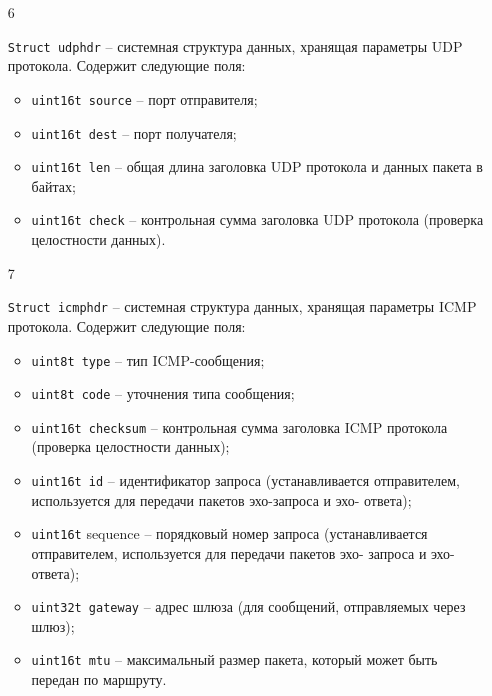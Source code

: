 \begin{enumerate}
    \item[6] {{\texttt{Struct udphdr}} -- системная структура данных, хранящая параметры UDP
    протокола. Содержит следующие поля:
        \begin{itemize}
            \item \texttt{u{\textunderscore}int16{\textunderscore}t source} -- порт отправителя;
            \item \texttt{u{\textunderscore}int16{\textunderscore}t dest} -- порт получателя;
            \item \texttt{u{\textunderscore}int16{\textunderscore}t len} -- общая длина заголовка UDP протокола и данных
            пакета в байтах;
            \item \texttt{u{\textunderscore}int16{\textunderscore}t check} -- контрольная сумма заголовка UDP протокола
            (проверка целостности данных).
        \end{itemize}}

    \item[7] {{\texttt{Struct icmphdr}} -- системная структура данных, хранящая параметры
    ICMP протокола. Содержит следующие поля:
    \begin{itemize}
        \item \texttt{u{\textunderscore}int8{\textunderscore}t type} -- тип ICMP-сообщения;
        \item \texttt{u{\textunderscore}int8{\textunderscore}t code} -- уточнения типа сообщения;
        \item \texttt{u{\textunderscore}int16{\textunderscore}t checksum} -- контрольная сумма заголовка ICMP
        протокола (проверка целостности данных);
        \item \texttt{u{\textunderscore}int16{\textunderscore}t id} -- идентификатор запроса (устанавливается
        отправителем, используется для передачи пакетов эхо-запроса и эхо-
        ответа);
        \item \texttt{u{\textunderscore}int16{\textunderscore}t} sequence -- порядковый номер запроса
        (устанавливается отправителем, используется для передачи пакетов эхо-
        запроса и эхо-ответа);
        \item \texttt{u{\textunderscore}int32{\textunderscore}t gateway} -- адрес шлюза (для сообщений, отправляемых
        через шлюз)\cite{unix_prof};
        \item \texttt{u{\textunderscore}int16{\textunderscore}t mtu} -- максимальный размер пакета, который может
        быть передан по маршруту.
    \end{itemize}}
\end{enumerate}